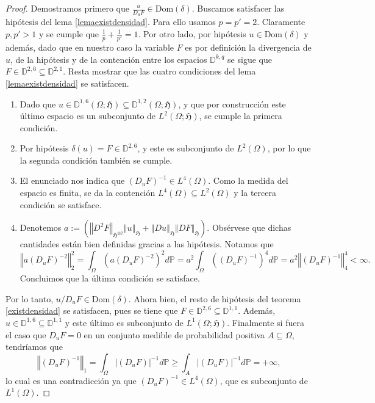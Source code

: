 \documentclass[letterpaper,twoside,12pt]{book}
\newcommand{\D}{\mathbb{D}}
\renewcommand{\P}{\mathbb{P}}
\newcommand{\1}{\mathds{1}}
\newcommand{\abs}[1]{\left\lvert #1 \right\rvert}
\newcommand{\norm}[1]{\left\Vert #1 \right\Vert}
\theoremstyle{definition}
\theoremstyle{definition}
\theoremstyle{remark}
\theoremstyle{definition}
\theoremstyle{definition}
\theoremstyle{definition}
\theoremstyle{definition}
\theoremstyle{definition}
\begin{document}
\begin{proof} 
   Demostramos primero que $\frac{u}{D_uF}\in \text{Dom}(\delta)$. Buscamos satisfacer las hipótesis del lema \ref{lemaexistdensidad}. Para ello usamos $p=p'=2$. Claramente $p,p'>1$ y se cumple que $\frac{1}{p}+\frac{1}{p'}=1$. Por otro lado, por hipótesis $u\in \text{Dom}(\delta)$ y además, dado que en nuestro caso la variable $F$ es por definición la divergencia de $u$, de la hipótesis y de la contención entre los espacios $\D^{k,q}$ se sigue que $F\in \D^{2,6}\subseteq\D^{2,1}$. Resta mostrar que las cuatro condiciones del lema \ref{lemaexistdensidad} se satisfacen.
   \begin{enumerate}
      \item Dado que $u\in \D^{1,6}(\Omega;\mathfrak{H})\subseteq\D^{1,2}(\Omega;\mathfrak{H})$, y que por construcción este último espacio es un subconjunto de $L^{2}(\Omega;\mathfrak{H})$, se cumple la primera condición.
      \item Por hipótesis $\delta(u)=F\in \D^{2,6}$, y este es subconjunto de $L^{2}(\Omega)$, por lo que la segunda condición también se cumple.
      \item El enunciado nos indica que $(D_uF)^{-1}\in L^4(\Omega)$. Como la medida del espacio es finita, se da la contención $L^4(\Omega)\subseteq L^2(\Omega)$ y la tercera condición se satisface.
      \item Denotemos $a:=\left(\norm{D^2F}_{\mathfrak{H}^{\otimes 2}}\norm{u}_{\mathfrak{H}}+\norm{Du}_{\mathfrak{H}}\norm{DF}_{\mathfrak{H}}\right)$. Obsérvese que dichas cantidades están bien definidas gracias a las hipótesis. Notamos que
      \[
      \norm{a(D_uF)^{-2}}_2^2=\int_\Omega (a(D_uF)^{-2})^2d\P=a^2\int_\Omega ((D_uF)^{-1})^4d\P=a^2\norm{(D_uF)^{-1}}_4^{4}<\infty.
      \] 
      Concluimos que la última condición se satisface.   
   \end{enumerate}
   Por lo tanto, $u/D_uF\in \text{Dom}(\delta)$. Ahora bien, el resto de hipótesis del teorema \ref{existdensidad} se satisfacen, pues se tiene que $F\in \D^{2,6}\subseteq \D^{1,1}$. Además, $u\in \D^{1,6}\subseteq \D^{1,1}$ y este último es subconjunto de $L^{1}(\Omega;\mathfrak{H})$. Finalmente si fuera el caso que $D_uF=0$ en un conjunto medible de probabilidad positiva $A\subseteq \Omega$, tendríamos que 
   \[
   \norm{(D_uF)^{-1}}_1=\int_\Omega \abs{(D_uF)}^{-1}d\P\geq\int_A\abs{(D_uF)}^{-1}d\P=+\infty,
   \]
   lo cual es una contradicción ya que $(D_uF)^{-1}\in L^{4}(\Omega)$, que es subconjunto de $L^{1}(\Omega)$.


\end{proof}
\end{document}
